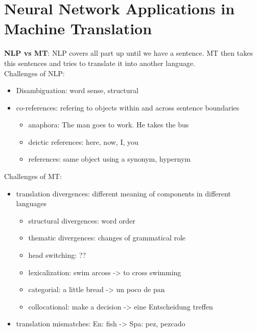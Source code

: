 \section{Neural Network Applications in Machine Translation}
\label{sect:neural-network-applications-in-machine-translation}
\textbf{NLP vs MT}: NLP covers all part up until we have a sentence. MT then takes this sentences and tries to translate it into another language.\\
Challenges of NLP:
\begin{itemize}
	\item Disambiguation: word sense, structural
	\item co-references: refering to objects within and across sentence boundaries
		\begin{itemize}
			\item anaphora: The man goes to work. He takes the bus
			\item deictic references: here, now, I, you
			\item references: same object using a synonym, hypernym
		\end{itemize}
\end{itemize}
Challenges of MT:
\begin{itemize}
	\item translation divergences: different meaning of components in different languages
		\begin{itemize}
			\item structural divergences: word order
			\item thematic divergences: changes of grammatical role
			\item head switching: ??
			\item lexicalization: swim arcoss -> to cross swimming
			\item categorial: a little bread -> un poco de pan
			\item collocational: make a decision -> eine Entscheidung treffen
		\end{itemize}
	\item translation mismatches: En: fish -> Spa: pez, pezcado
\end{itemize}


